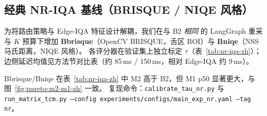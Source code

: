 \subsection{经典 NR-IQA 基线（BRISQUE / NIQE 风格）}
\label{sec:nr-iqa-baselines-zh}

为将路由策略与 Edge-IQA 特征设计解耦，我们在与 B2 \emph{相同} 的 LangGraph 重采与 $K$ 预算下增加 \textbf{Bbrisque}（OpenCV BRISQUE，舌区 ROI）与 \textbf{Bniqe}（NSS 马氏距离，NIQE 风格）。
各评分器在验证集上独立标定 $\tau$（表~\ref{tab:nr-iqa-zh}）；边侧延迟均值见方法节对比表（约 85\,ms / 150\,ms，相对 Edge-IQA 约 9\,ms）。



Bbrisque/Bniqe 在表~\ref{tab:nr-iqa-zh} 中 M2 高于 B2，但 M1 p50 显著更大，与图~\ref{fig:pareto-m2-m1-zh} 一致。
复现命令：\texttt{calibrate\_tau\_nr.py} 与 \texttt{run\_matrix\_tcm.py --config experiments/configs/main\_exp\_nr.yaml --tag nr}。
